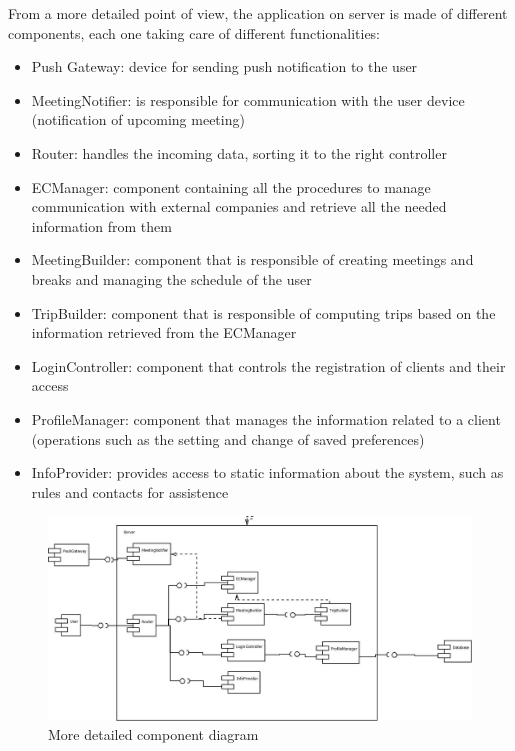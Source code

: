 \documentclass[a4paper,leqno]{article}
\begin{document}
From a more detailed point of view, the application on server is made of different components, each one taking care of different functionalities:
\begin{itemize}
	\item Push Gateway: device for sending push notification to the user
	\item MeetingNotifier: is responsible for communication with the user device (notification of upcoming meeting)
	\item Router: handles the incoming data, sorting it to the right controller
	\item ECManager: component containing all the procedures to manage communication with external companies and retrieve all the needed information from them
	\item MeetingBuilder: component that is responsible of creating meetings and breaks and managing the schedule of the user
	\item TripBuilder: component that is responsible of computing trips based on the information retrieved from the ECManager
	\item LoginController: component that controls the registration of clients and their access 
	\item ProfileManager: component that manages the information related to a client (operations such as the setting and change of saved preferences)
	\item InfoProvider: provides access to static information about the system, such as rules and contacts for assistence
\end{itemize}

\begin{figure}[!h]
	\centering
	\begin{center}
		\includegraphics[scale=0.3]{component}
	\end{center}
	\caption{More detailed component diagram}
\end{figure}
\end{document}
